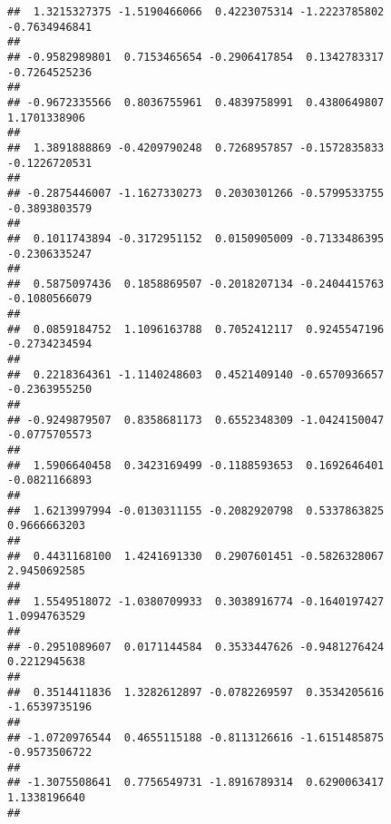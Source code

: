 \documentclass[]{article}
\begin{document}
\begin{verbatim}
##  1.3215327375 -1.5190466066  0.4223075314 -1.2223785802 -0.7634946841 
##                                                                       
## -0.9582989801  0.7153465654 -0.2906417854  0.1342783317 -0.7264525236 
##                                                                       
## -0.9672335566  0.8036755961  0.4839758991  0.4380649807  1.1701338906 
##                                                                       
##  1.3891888869 -0.4209790248  0.7268957857 -0.1572835833 -0.1226720531 
##                                                                       
## -0.2875446007 -1.1627330273  0.2030301266 -0.5799533755 -0.3893803579 
##                                                                       
##  0.1011743894 -0.3172951152  0.0150905009 -0.7133486395 -0.2306335247 
##                                                                       
##  0.5875097436  0.1858869507 -0.2018207134 -0.2404415763 -0.1080566079 
##                                                                       
##  0.0859184752  1.1096163788  0.7052412117  0.9245547196 -0.2734234594 
##                                                                       
##  0.2218364361 -1.1140248603  0.4521409140 -0.6570936657 -0.2363955250 
##                                                                       
## -0.9249879507  0.8358681173  0.6552348309 -1.0424150047 -0.0775705573 
##                                                                       
##  1.5906640458  0.3423169499 -0.1188593653  0.1692646401 -0.0821166893 
##                                                                       
##  1.6213997994 -0.0130311155 -0.2082920798  0.5337863825  0.9666663203 
##                                                                       
##  0.4431168100  1.4241691330  0.2907601451 -0.5826328067  2.9450692585 
##                                                                       
##  1.5549518072 -1.0380709933  0.3038916774 -0.1640197427  1.0994763529 
##                                                                       
## -0.2951089607  0.0171144584  0.3533447626 -0.9481276424  0.2212945638 
##                                                                       
##  0.3514411836  1.3282612897 -0.0782269597  0.3534205616 -1.6539735196 
##                                                                       
## -1.0720976544  0.4655115188 -0.8113126616 -1.6151485875 -0.9573506722 
##                                                                       
## -1.3075508641  0.7756549731 -1.8916789314  0.6290063417  1.1338196640 
##                                                                       

\end{verbatim}
\end{document}
